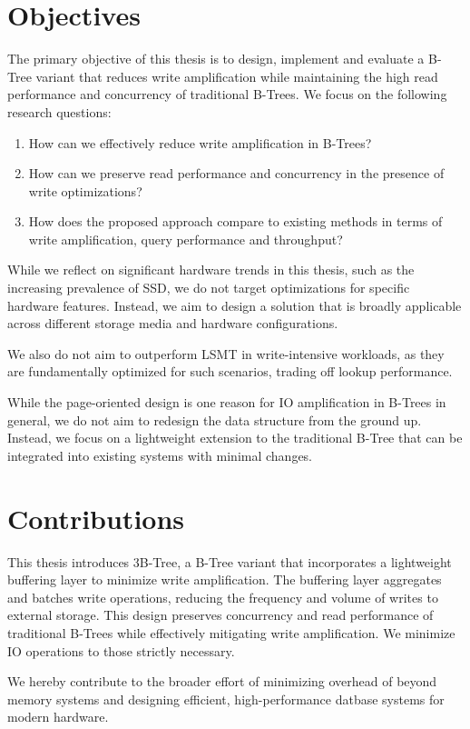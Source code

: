 
\section{Objectives}
The primary objective of this thesis is to design, implement and evaluate a B-Tree variant that reduces write amplification while maintaining the high read performance and concurrency of traditional B-Trees.
We focus on the following research questions:
\begin{enumerate}
  \item How can we effectively reduce write amplification in B-Trees?
  \item How can we preserve read performance and concurrency in the presence of write optimizations?
  \item How does the proposed approach compare to existing methods in terms of write amplification, query performance and throughput?
\end{enumerate}

While we reflect on significant hardware trends in this thesis, such as the increasing prevalence of \ac{SSD}, we do not target optimizations for specific hardware features.
Instead, we aim to design a solution that is broadly applicable across different storage media and hardware configurations.

We also do not aim to outperform \ac{LSMT} in write-intensive workloads, as they are fundamentally optimized for such scenarios, trading off lookup performance.

While the page-oriented design is one reason for \ac{IO} amplification in B-Trees in general, we do not aim to redesign the data structure from the ground up.
Instead, we focus on a lightweight extension to the traditional B-Tree that can be integrated into existing systems with minimal changes.

\section{Contributions}
This thesis introduces 3B-Tree, a B-Tree variant that incorporates a lightweight buffering layer to minimize write amplification.
The buffering layer aggregates and batches write operations, reducing the frequency and volume of writes to external storage.
This design preserves concurrency and read performance of traditional B-Trees while effectively mitigating write amplification.
We minimize \ac{IO} operations to those strictly necessary. 

We hereby contribute to the broader effort of minimizing overhead of beyond memory systems and designing efficient, high-performance datbase systems for modern hardware.
